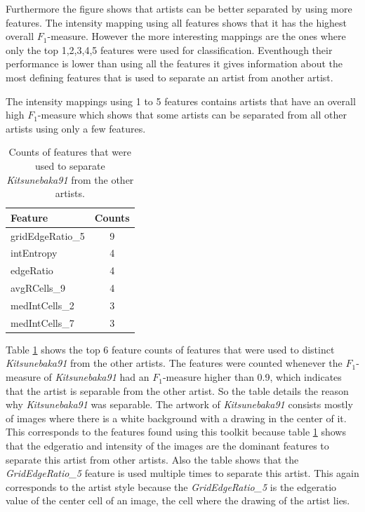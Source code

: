 Furthermore the figure shows that artists can be better separated by using more features.
The intensity mapping using all features shows that it has the highest overall $F_1$-measure.
However the more interesting mappings are the ones where only the top 1,2,3,4,5 features were used for classification.
Eventhough their performance is lower than using all the features it gives information about the most defining features that is used to separate an artist from another artist.

The intensity mappings using 1 to 5 features contains artists that have an overall high $F_1$-measure which shows that some artists can be separated from all other artists using only a few features.

\begin{table}[htb]
    \centering
    \begin{tabular}
        { | l | c |} 
        \hline
        Feature & Counts \\
        \hline
        gridEdgeRatio\_5 & 9 \\ 
        intEntropy & 4 \\ 
        edgeRatio & 4 \\ 
        avgRCells\_9 & 4 \\ 
        medIntCells\_2 & 3 \\
        medIntCells\_7 & 3 \\
        \hline 
    \end{tabular}
    \caption{Counts of features that were used to separate \textit{Kitsunebaka91} from the other artists.}
    \label{kitsune}
\end{table}

Table \ref{kitsune} shows the top 6 feature counts of features that were used to distinct \textit{Kitsunebaka91} from the other artists.
The features were counted whenever the $F_1$-measure of \textit{Kitsunebaka91} had an $F_1$-measure higher than 0.9, which indicates that the artist is separable from the other artist.
So the table details the reason why \textit{Kitsunebaka91} was separable.
The artwork of \textit{Kitsunebaka91} consists mostly of images where there is a white background with a drawing in the center of it.
This corresponds to the features found using this toolkit because table \ref{kitsune} shows that the edgeratio and intensity of the images are the dominant features to separate this artist from other artists.
Also the table shows that the \textit{GridEdgeRatio\_5} feature is used multiple times to separate this artist.
This again corresponds to the artist style because the \textit{GridEdgeRatio\_5} is the edgeratio value of the center cell of an image, the cell where the drawing of the artist lies.


